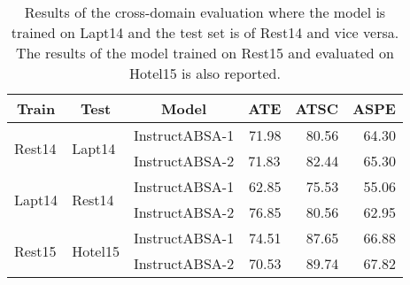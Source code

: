 \documentclass[11pt]{article}
\newcommand{\name}{\textsc{I}nstruct\textsc{ABSA}\xspace}
\begin{document}
\begin{table}[t!]
\centering
\resizebox{\linewidth}{!}
{
\begin{tabular}{lll|rrr}
\hline
\multicolumn{1}{c}{\textbf{Train}} & \multicolumn{1}{c}{\textbf{Test}} & \multicolumn{1}{c|}{\textbf{Model}} & \multicolumn{1}{c}{\textbf{ATE}} & \multicolumn{1}{c}{\textbf{ATSC}} & \multicolumn{1}{c}{\textbf{ASPE}} \\ \hline
\multirow{2}{*}{Rest14}            & \multirow{2}{*}{Lapt14}           & \name{}-1                                  & 71.98                            & 80.56                             & 64.30                              \\
                                   &                                   & \name{}-2                                  & \multicolumn{1}{l}{71.83}        & 82.44                             & 65.30                              \\ \hline
\multirow{2}{*}{Lapt14}            & \multirow{2}{*}{Rest14}           & \name{}-1                                  & 62.85                            & 75.53                             & 55.06                              \\
                                   &                                   & \name{}-2                                  & 76.85                            & 80.56                             & 62.95                              \\ \hline
\multirow{2}{*}{Rest15}            & \multirow{2}{*}{Hotel15}           & \name{}-1                                  & 74.51                            & 87.65                             & 66.88                              \\
                                   &                                   & \name{}-2                                  & 70.53                            & 89.74                             & 67.82                              \\ \hline
\end{tabular}
}
\caption{Results of the cross-domain evaluation where the model is trained on Lapt14 and the test set is of Rest14 and vice versa. The results of the model trained on Rest15 and evaluated on Hotel15 is also reported.}
\label{tab:cross_domain}
\end{table} 
\end{document}
